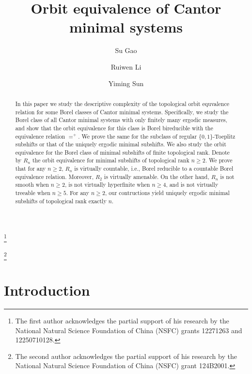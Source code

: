\documentclass{amsart}
\theoremstyle{definition}
\theoremstyle{problem}
\theoremstyle{remark}
\numberwithin{equation}{section}
\begin{document}
\title{Orbit equivalence of Cantor minimal systems }
\author{Su Gao}
\address{School of Mathematical Sciences and LPMC, Nankai University, Tianjin 300071, P.R. China}
\thanks{The first author acknowledges the partial support of his research by the National Natural Science Foundation of China (NSFC) grants 12271263 and 12250710128.}
\author{Ruiwen Li}
\address{School of Mathematical Sciences and LPMC, Nankai University, Tianjin 300071, P.R. China}
\thanks{The second author acknowledges the partial support of his research by the National Natural Science Foundation of China (NSFC) grant 124B2001.}
\author{Yiming Sun}
\address{School of Mathematical Sciences and LPMC, Nankai University, Tianjin 300071, P.R. China}
\begin{abstract} In this paper we study the descriptive complexity of the topological orbit equvalence relation for some Borel classes of Cantor minimal systems. Specifically, we study the Borel class of all Cantor minimal systems with only finitely many ergodic measures, and show that the orbit equivalence for this class is Borel bireducible with the equivalence relation $=^+$. We prove the same for the subclass of regular $\{0,1\}$-Toeplitz subshifts or that of the uniquely ergodic minimal subshifts. We also study the orbit equivalence for the Borel class of minimal subshifts of finite topological rank. Denote by $R_n$ the orbit equivalence for minimal subshifts of topological rank $n\geq 2$. We prove that for any $n\geq 2$, $R_n$ is virtually countable, i.e., Borel reducible to a  countable Borel equivalence relation. Moreover, $R_2$ is virtually amenable. On the other hand, $R_n$ is not smooth when $n\ge 2$, is not virtually hyperfinite when $n\ge 4$,  and is not virtually treeable when $n\ge 5$. For any $n\geq 2$, our contructions yield uniquely ergodic minimal subshifts of topological rank exactly $n$.
\end{abstract}




\maketitle

\section{Introduction}
\end{document}

